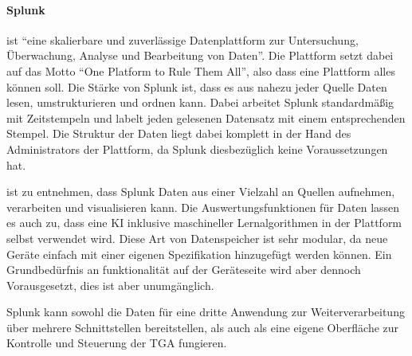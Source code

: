 \paragraph{Splunk} ist \enquote{eine skalierbare und zuverlässige Datenplattform zur Untersuchung, Überwachung, Analyse und Bearbeitung von Daten}. \cite{splunk2021} Die Plattform setzt dabei auf das Motto \enquote{One Platform to Rule Them All}, also dass eine Plattform alles können soll. Die Stärke von Splunk ist, dass es aus nahezu jeder Quelle Daten lesen, umstrukturieren und ordnen kann. Dabei arbeitet Splunk standardmäßig mit Zeitstempeln und labelt jeden gelesenen Datensatz mit einem entsprechenden Stempel. Die Struktur der Daten liegt dabei komplett in der Hand des Administrators der Plattform, da Splunk diesbezüglich keine Voraussetzungen hat.

 ist zu entnehmen, dass Splunk Daten aus einer Vielzahl an Quellen aufnehmen, verarbeiten und visualisieren kann. Die Auswertungsfunktionen für Daten lassen es auch zu, dass eine \gls{KI} inklusive maschineller Lernalgorithmen in der Plattform selbst verwendet wird. Diese Art von Datenspeicher ist sehr modular, da neue Geräte einfach mit einer eigenen Spezifikation hinzugefügt werden können. Ein Grundbedürfnis an funktionalität auf der Geräteseite wird aber dennoch Vorausgesetzt, dies ist aber unumgänglich.

Splunk kann sowohl die Daten für eine dritte Anwendung zur Weiterverarbeitung über mehrere Schnittstellen bereitstellen, als auch als eine eigene Oberfläche zur Kontrolle und Steuerung der \gls{TGA} fungieren.